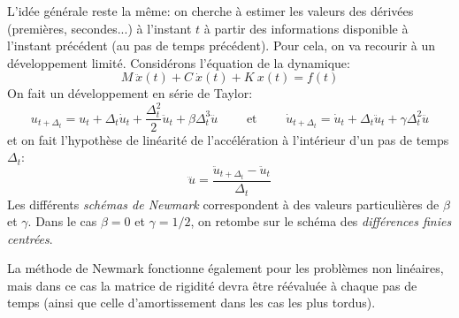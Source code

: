 L'idée générale reste la même: on cherche à estimer les valeurs des dérivées (premières, secondes...) à l'instant $t$ à partir des informations disponible à l'instant précédent (au pas de temps précédent). Pour cela, on va recourir à un développement limité. Considérons l'équation de la dynamique:
\begin{equation}
M\ \ddot x(t) + C\ \dot x(t) + K\ x(t)= f(t)
\end{equation}
On fait un développement en série de Taylor: 
\begin{equation}
u_{t+\Delta_t}=u_t+\Delta_t \dot{u}_t+\frac{\Delta_t^2}2\ddot{u}_t+\beta\Delta_t^3\dddot{u} \qquad\text{ et }\qquad \dot{u}_{t+\Delta_t} = \dot{u}_t+\Delta_t\ddot{u}_t+\gamma\Delta_t^2\dddot{u}
\end{equation}
et on fait l'hypothèse de linéarité de l'accélération à l'intérieur d'un pas de temps $\Delta_t$:
\begin{equation}
\dddot{u}=\dfrac{\ddot{u}_{t+\Delta_t}-\ddot{u}_t}{\Delta_t}
\end{equation}
Les différents \emph{schémas de Newmark} correspondent à des valeurs particulières de $\beta$ et $\gamma$. Dans le cas $\beta=0$ et $\gamma=1/2$, on retombe sur le schéma des \emph{différences finies centrées}. 

La méthode de Newmark fonctionne également pour les problèmes non linéaires, mais dans ce cas la matrice de rigidité devra être réévaluée à chaque pas de temps (ainsi que celle d'amortissement dans les cas les plus tordus). 